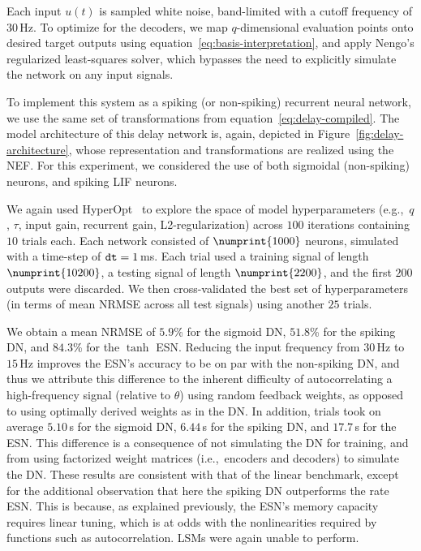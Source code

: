 Each input $u(t)$ is sampled white noise, band-limited with a cutoff frequency of $30$\,Hz.
To optimize for the decoders, we map $q$-dimensional evaluation points onto desired target outputs using equation~\ref{eq:basis-interpretation}, and apply Nengo's regularized least-squares solver, which bypasses the need to explicitly simulate the network on any input signals.

To implement this system as a spiking (or non-spiking) recurrent neural network, we use the same set of transformations from equation~\ref{eq:delay-compiled}. %
The model architecture of this delay network is, again, depicted in Figure~\ref{fig:delay-architecture}, whose representation and transformations are realized using the NEF.
For this experiment, we considered the use of both sigmoidal (non-spiking) neurons, and spiking LIF neurons.

We again used HyperOpt~\citep{bergstra2015hyperopt} to explore the space of model hyperparameters (e.g.,~$q$, $\tau$, input gain, recurrent gain, L2-regularization) across $100$ iterations containing $10$ trials each.
Each network consisted of $\numprint{1000}$ neurons, simulated with a time-step of $\texttt{dt}{} = 1$\,ms.
Each trial used a training signal of length $\numprint{10200}$, a testing signal of length $\numprint{2200}$, and the first $200$ outputs were discarded.
We then cross-validated the best set of hyperparameters (in terms of mean NRMSE across all test signals) using another $25$ trials.

We obtain a mean NRMSE of $5.9$\% for the sigmoid DN, $51.8$\% for the spiking DN, and $84.3$\% for the $\tanh$ ESN.
Reducing the input frequency from $30$\,Hz to $15$\,Hz improves the ESN's accuracy to be on par with the non-spiking DN, and thus we attribute this difference to the inherent difficulty of autocorrelating a high-frequency signal (relative to $\theta$) using random feedback weights, as opposed to using optimally derived weights as in the DN.
In addition, trials took on average $5.10$\,s for the sigmoid DN, $6.44$\,s for the spiking DN, and $17.7$\,s for the ESN.
This difference is a consequence of not simulating the DN for training, and from using factorized weight matrices (i.e.,~encoders and decoders) to simulate the DN.
These results are consistent with that of the linear benchmark, except for the additional observation that here the spiking DN outperforms the rate ESN.
This is because, as explained previously, the ESN's memory capacity requires linear tuning, which is at odds with the nonlinearities required by functions such as autocorrelation.
LSMs were again unable to perform.


